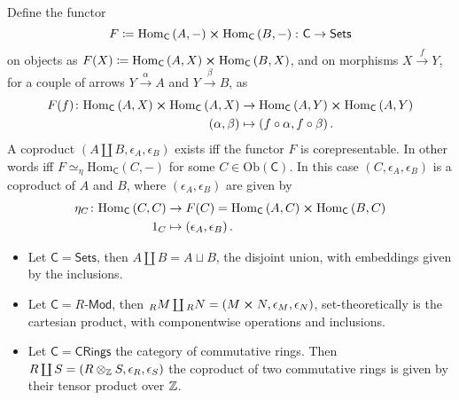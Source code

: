 \begin{prop}
	Define the functor 
	\begin{equation}
	F \coloneqq \mathrm{Hom}_{\mathsf{C}} \left( A, - \right) \cross \mathrm{Hom}_{\mathsf{C}} \left( B, - \right)\colon \mathsf{C} \to \mathsf{Sets}
	\end{equation} 
	on objects as $F(X) \coloneqq \mathrm{Hom}_{\mathsf{C}} \left( A, X \right) \cross \mathrm{Hom}_{\mathsf{C}} \left( B, X \right)$, and on morphisms $X \xrightarrow{f} Y$, for a couple of arrows $Y \xrightarrow{\alpha} A$ and $Y \xrightarrow{\beta} B$, as
	\begin{align}
		F(f)\colon \mathrm{Hom}_{\mathsf{C}} \left( A, X \right) \cross \mathrm{Hom}_{\mathsf{C}} \left( A, X \right) &\to \mathrm{Hom}_{\mathsf{C}} \left( A, Y \right) \cross \mathrm{Hom}_{\mathsf{C}} \left( A, Y \right) \\
		\left(\alpha, \beta\right) &\mapsto \left(f \circ \alpha, f \circ \beta \right)
	.\end{align} 
	A coproduct $\left(A \coprod B, \epsilon_A, \epsilon_B \right)$ exists iff the functor $F$ is corepresentable.
	In other words iff $F \simeq_\eta \mathrm{Hom}_{\mathsf{C}} \left( C, - \right)$
	for some $C \in \mathrm{Ob} \left(\mathsf{C}\right)$.
	In this case $\left(C, \epsilon_A, \epsilon_B\right)$ is a coproduct of $A$ and $B$,
	where $\left(\epsilon_A, \epsilon_B\right)$ are given by
	\begin{align}
		\eta_C\colon \mathrm{Hom}_{\mathsf{C}} \left( C, C \right) &\to F(C) = \mathrm{Hom}_{\mathsf{C}} \left( A, C \right) \cross \mathrm{Hom}_{\mathsf{C}} \left( B, C \right)  \\
		1_C &\mapsto \left(\epsilon_A, \epsilon_B\right)
	.\end{align} 
\end{prop} 

\begin{ex}\leavevmode\vspace{-.2\baselineskip}
	\begin{itemize}
		\item Let $\mathsf{C} = \mathsf{Sets}$, then $A \coprod B = A \sqcup B$, the disjoint union, with embeddings given by the inclusions.
		\item Let $\mathsf{C} = R\text{-}\mathsf{Mod}$, then ${}_RM \coprod {}_RN = \left(M \cross N, \epsilon_M, \epsilon_N\right)$, set-theoretically is the cartesian product, with componentwise operations and inclusions.
		\item Let $\mathsf{C} = \mathsf{CRings}$ the category of commutative rings.
			Then $R \coprod S = \left(R \otimes_{\mathbb{Z}} S, \epsilon_R, \epsilon_S\right)$ the coproduct of two commutative rings is given by their tensor product over $\mathbb{Z}$.
	\end{itemize}
\end{ex} 

